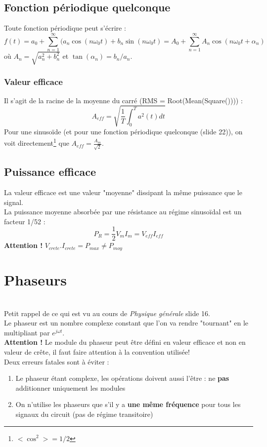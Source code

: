 \documentclass[11pt, a4paper, openany]{book}
\begin{document}
		\subsection{Fonction périodique quelconque}
		Toute fonction périodique peut s'écrire : 
		\begin{equation}
		f(t) = a_0 + \sum_{n=1}^\infty(a_n \cos(n\omega_0t) + b_n\sin(n\omega_0t) = A_0 + \sum_{n=1}^\infty A_n\cos(n\omega_0 t + \alpha_n)
		\end{equation}
		où $A_n = \sqrt{a^2_n + b^2_n}$ et $\tan(\alpha_n) = b_n/a_n$.
		
		\subsubsection{Valeur efficace}
		Il s'agit de la racine de la moyenne du carré (RMS = Root(Mean(Square()))) :
		\begin{equation}
		A_{eff} = \sqrt{\frac{1}{T}\int_0^T a^2(t) dt}
		\end{equation}
		Pour une sinusoïde (et pour une fonction périodique quelconque (slide 22)), on voit directement\footnote{$<\cos^2> = 1/2$} que $A_{eff} = \frac{A_m}{\sqrt{2}}$.
		
		\subsection{Puissance efficace}
		La valeur efficace est une valeur "moyenne" dissipant la même puissance que le signal.\\
		La puissance moyenne absorbée par une résistance au régime sinusoïdal est un facteur 1/52 :
		\begin{equation}
		P_R = \frac{1}{2}V_mI_m = V_{eff}I_{eff}
		\end{equation}
		\textbf{Attention !} $V_{crete}.I_{crete} = P_{max} \neq P_{moy}$
		\section{Phaseurs}
		\ \\
		Petit rappel de ce qui est vu au cours de \textit{Physique générale} slide 16.\\
		
		Le phaseur est un nombre complexe constant que l'on va rendre "tournant" en le multipliant par $e^{j\omega t}$.\\
		\textbf{Attention !} Le module du phaseur peut être défini en valeur efficace et non en valeur de crête, il faut faire attention à la convention utilisée! \\
		Deux erreurs fatales sont à éviter :
		\begin{enumerate}
			\item Le phaseur étant complexe, les opérations doivent aussi l'être : ne \textbf{pas} additionner uniquement les modules
			\item On n'utilise les phaseurs que s'il y a \textbf{une même fréquence} pour tous les signaux du circuit (pas de régime transitoire)
		\end{enumerate}
		\newpage
\end{document}
